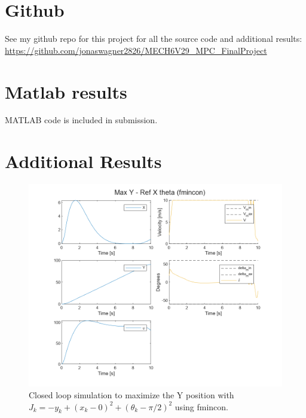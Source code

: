 \documentclass[]{IEEEtran}
\begin{document}

{} 


\appendix
\section*{Github}
See my github repo for this project for all the source code and additional results: 
\url{https://github.com/jonaswagner2826/MECH6V29_MPC_FinalProject}

\section*{Matlab results}\label{apx:MATLAB}
MATLAB code is included in submission.

\section*{Additional Results}
\begin{figure}[h]
    \centering
    \includegraphics[width = \columnwidth]{figs/Max_Y_-_Ref_X_theta_(fmincon)_traj.png}
    \caption{Closed loop simulation to maximize the Y position with $J_k = -y_k + (x_k - 0)^2 + (\theta_k - \pi/2)^2$ using fmincon.}\label{fig:maxY_fmincon}
\end{figure}
\end{document}
